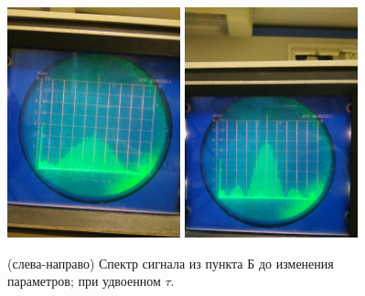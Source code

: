 \documentclass[a4paper,12pt]{article}
\begin{document}
\begin{figure}[tpb]
\centering
\includegraphics[width=50mm]{Pictures/B2-a50.jpg}
\includegraphics[width=50mm]{Pictures/B2-a100.jpg}
\caption{(слева-направо) Спектр сигнала из пункта Б до изменения параметров; при удвоенном $\tau$.}
\label{B_2a}
\end{figure}
\end{document}
